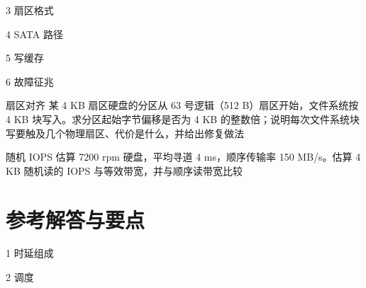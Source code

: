 \begin{chapterexercise}{3}
扇区格式
\end{chapterexercise}

\begin{chapterexercise}{4}
SATA 路径
\end{chapterexercise}

\begin{chapterexercise}{5}
写缓存
\end{chapterexercise}

\begin{chapterexercise}{6}
故障征兆
\end{chapterexercise}

\begin{chapterexercise}{扇区对齐}
某 4 KB 扇区硬盘的分区从 63 号逻辑（512 B）扇区开始，文件系统按 4 KB 块写入。求分区起始字节偏移是否为 4 KB 的整数倍；说明每次文件系统块写要触及几个物理扇区、代价是什么，并给出修复做法
\end{chapterexercise}

\begin{chapterexercise}{随机 IOPS 估算}
7200 rpm 硬盘，平均寻道 4 ms，顺序传输率 150 MB/s。估算 4 KB 随机读的 IOPS 与等效带宽，并与顺序读带宽比较
\end{chapterexercise}

\section*{参考解答与要点}

\begin{chapteranswer}{1}
时延组成
\end{chapteranswer}

\begin{chapteranswer}{2}
调度
\end{chapteranswer}

